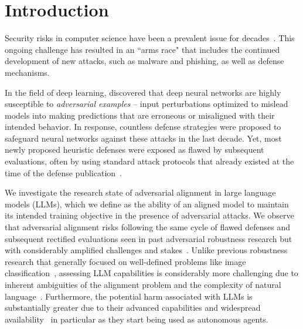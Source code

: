 \section{Introduction}


Security risks in computer science have been a prevalent issue for decades~\cite{valiant_learning_1985, kearns_learning_1993}.
This ongoing challenge has resulted in an ``arms race" that includes the continued development of new attacks, such as malware and phishing, as well as defense mechanisms. %

In the field of deep learning, \citet{szegedy_intriguing_2014} discovered that deep neural networks are highly susceptible to \textit{adversarial examples} -- input perturbations optimized to mislead models into making predictions that are erroneous or misaligned with their intended behavior. In response, countless defense strategies were proposed to safeguard neural networks against these attacks in the last decade. Yet, most newly proposed heuristic defenses were exposed as flawed by subsequent evaluations, often by using standard attack protocols that already existed at the time of the defense publication~\citep{tramer_adaptive_2020}. 

We investigate the research state of adversarial alignment in large language models (LLMs), which we define as the ability of an aligned model to maintain its intended training objective in the presence of adversarial attacks. 
We observe that adversarial alignment risks following the same cycle of flawed defenses and subsequent rectified evaluations seen in past adversarial robustness research but with considerably amplified challenges and stakes~\cite{hendrycks2022x, zou2023universal, schwinn2023adversarial}. 
Unlike previous robustness research that generally focused on well-defined problems like image classification~\cite{goodfellow_explaining_2015}, assessing LLM capabilities is considerably more challenging due to inherent ambiguities of the alignment problem and the complexity of natural language~\cite{wolf2023fundamental, andriushchenko2024jailbreaking, li2024llm}. Furthermore, the potential harm associated with LLMs is substantially greater due to their advanced capabilities and widespread availability~\cite{hendrycks2022x} in particular as they start being used as autonomous agents.  %

